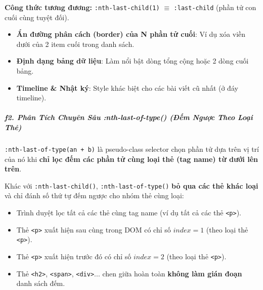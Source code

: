 \documentclass[11pt,oneside]{book}
\newcommand{\codeinline}[1]{\textcolor{accentOrange}{\texttt{#1}}}
\begin{document}
\begin{tipBox}
\textbf{Công thức tương đương:} \codeinline{:nth-last-child(1)} $\equiv$ \codeinline{:last-child} (phần tử con cuối cùng tuyệt đối).
\end{tipBox}

\begin{conceptBox}
\begin{itemize}[leftmargin=1.5em, itemsep=3pt, parsep=0pt]
    \item \textbf{Ẩn đường phân cách (border) của N phần tử cuối}: Ví dụ xóa viền dưới của 2 item cuối trong danh sách.
    \item \textbf{Định dạng bảng dữ liệu}: Làm nổi bật dòng tổng cộng hoặc 2 dòng cuối bảng.
    \item \textbf{Timeline \& Nhật ký}: Style khác biệt cho các bài viết cũ nhất (ở đáy timeline).
\end{itemize}
\end{conceptBox}


\subparagraph{f2. Phân Tích Chuyên Sâu :nth-last-of-type() (Đếm Ngược Theo Loại Thẻ)}

\codeinline{:nth-last-of-type(an + b)} là pseudo-class selector chọn phần tử dựa trên vị trí của nó khi \textbf{chỉ lọc đếm các phần tử cùng loại thẻ (tag name) từ dưới lên trên}.

\begin{conceptBox}
Khác với \codeinline{:nth-last-child()}, \codeinline{:nth-last-of-type()} \textbf{bỏ qua các thẻ khác loại} và chỉ đánh số thứ tự đếm ngược cho nhóm thẻ cùng loại:
\begin{itemize}[leftmargin=1.5em, itemsep=2pt, parsep=0pt]
    \item Trình duyệt lọc tất cả các thẻ cùng tag name (ví dụ tất cả các thẻ \codeinline{<p>}).
    \item Thẻ \codeinline{<p>} xuất hiện sau cùng trong DOM có chỉ số $index = 1$ (theo loại thẻ \codeinline{<p>}).
    \item Thẻ \codeinline{<p>} xuất hiện trước đó có chỉ số $index = 2$ (theo loại thẻ \codeinline{<p>}).
    \item Thẻ \codeinline{<h2>}, \codeinline{<span>}, \codeinline{<div>}... chen giữa hoàn toàn \textbf{không làm gián đoạn} danh sách đếm.
\end{itemize}
\end{conceptBox}
\end{document}
